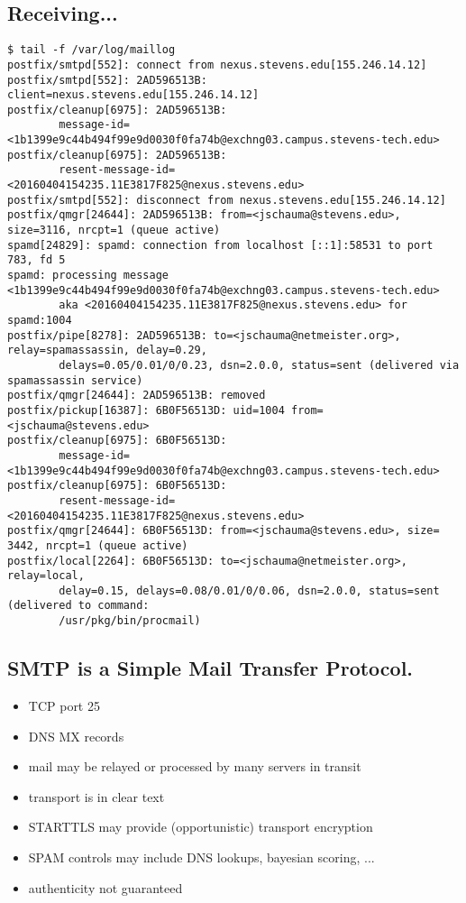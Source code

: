 \documentclass[xga]{xdvislides}
\begin{document}
\subsection{Receiving...}
\begin{verbatim}
$ tail -f /var/log/maillog
postfix/smtpd[552]: connect from nexus.stevens.edu[155.246.14.12]
postfix/smtpd[552]: 2AD596513B: client=nexus.stevens.edu[155.246.14.12]
postfix/cleanup[6975]: 2AD596513B:
        message-id=<1b1399e9c44b494f99e9d0030f0fa74b@exchng03.campus.stevens-tech.edu>
postfix/cleanup[6975]: 2AD596513B:
        resent-message-id=<20160404154235.11E3817F825@nexus.stevens.edu>
postfix/smtpd[552]: disconnect from nexus.stevens.edu[155.246.14.12]
postfix/qmgr[24644]: 2AD596513B: from=<jschauma@stevens.edu>, size=3116, nrcpt=1 (queue active)
spamd[24829]: spamd: connection from localhost [::1]:58531 to port 783, fd 5
spamd: processing message <1b1399e9c44b494f99e9d0030f0fa74b@exchng03.campus.stevens-tech.edu>
        aka <20160404154235.11E3817F825@nexus.stevens.edu> for spamd:1004
postfix/pipe[8278]: 2AD596513B: to=<jschauma@netmeister.org>, relay=spamassassin, delay=0.29,
        delays=0.05/0.01/0/0.23, dsn=2.0.0, status=sent (delivered via spamassassin service)
postfix/qmgr[24644]: 2AD596513B: removed
postfix/pickup[16387]: 6B0F56513D: uid=1004 from=<jschauma@stevens.edu>
postfix/cleanup[6975]: 6B0F56513D:
        message-id=<1b1399e9c44b494f99e9d0030f0fa74b@exchng03.campus.stevens-tech.edu>
postfix/cleanup[6975]: 6B0F56513D:
        resent-message-id=<20160404154235.11E3817F825@nexus.stevens.edu>
postfix/qmgr[24644]: 6B0F56513D: from=<jschauma@stevens.edu>, size= 3442, nrcpt=1 (queue active)
postfix/local[2264]: 6B0F56513D: to=<jschauma@netmeister.org>, relay=local,
        delay=0.15, delays=0.08/0.01/0/0.06, dsn=2.0.0, status=sent (delivered to command:
        /usr/pkg/bin/procmail)
\end{verbatim}
\Normalsize

\subsection{SMTP is a Simple Mail Transfer Protocol.}

\begin{itemize}
	\item TCP port 25
	\item DNS MX records
	\item mail may be relayed or processed by many servers in transit
	\item transport is in clear text
	\item STARTTLS may provide (opportunistic) transport encryption
	\item SPAM controls may include DNS lookups, bayesian scoring, ...
	\item authenticity not guaranteed
\end{itemize}
\end{document}
